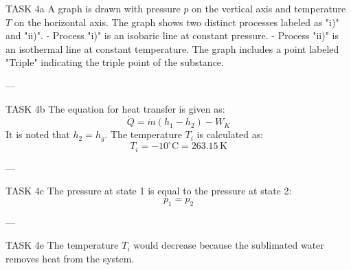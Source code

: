 TASK 4a  
A graph is drawn with pressure \( p \) on the vertical axis and temperature \( T \) on the horizontal axis. The graph shows two distinct processes labeled as "i)" and "ii)".  
- Process "i)" is an isobaric line at constant pressure.  
- Process "ii)" is an isothermal line at constant temperature.  
The graph includes a point labeled "Triple" indicating the triple point of the substance.  

---

TASK 4b  
The equation for heat transfer is given as:  
\[
\dot{Q} = \dot{m} \left( h_1 - h_2 \right) - W_K
\]  
It is noted that \( h_2 = h_g \).  
The temperature \( T_i \) is calculated as:  
\[
T_i = -10^\circ\text{C} = 263.15 \, \text{K}
\]  

---

TASK 4c  
The pressure at state 1 is equal to the pressure at state 2:  
\[
p_1 = p_2
\]  

---

TASK 4e  
The temperature \( T_i \) would decrease because the sublimated water removes heat from the system.